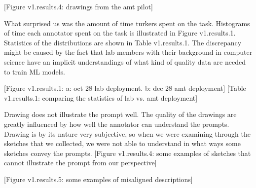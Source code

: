 [Figure v1.results.4: drawings from the amt pilot]

What surprised us was the amount of time turkers spent on the task. Histograms of time each annotator spent on the task is illustrated in Figure v1.results.1. Statistics of the distributions are shown in Table v1.results.1. The discrepancy might be caused by the fact that lab members with their background in computer science have an implicit understandings of what kind of quality data are needed to train ML models.   

[Figure v1.results.1: a: oct 28 lab deployment. b: dec 28 amt deployment]
[Table v1.results.1: comparing the statistics of lab vs. amt deployment]

Drawing does not illustrate the prompt well. The quality of the drawings are greatly influenced by how well the annotator can understand the prompts. Drawing is by its nature very subjective, so when we were examining through the sketches that we collected, we were not able to understand in what ways some sketches convey the prompts. 
[Figure v1.results.4: some examples of sketches that cannot illustrate the prompt from our perspective]

[Figure v1.results.5: some examples of misaligned descriptions]